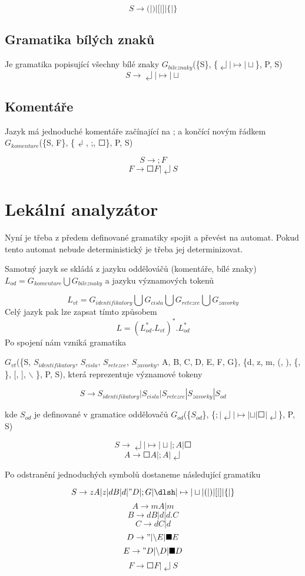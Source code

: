 \documentclass[a4paper,11pt]{article}
\begin{document}
$$S \rightarrow (|)|[|]|\{|\}$$

\subsection{Gramatika bílých znaků}
Je gramatika popisující všechny bílé znaky $G_{bileznaky}$(\{S\}, \{$\dlsh | \mapsto | \sqcup$\}, P, S)
$$S \rightarrow  \dlsh | \mapsto | \sqcup$$

\subsection{Komentáře}
Jazyk má jednoduché komentáře začínající na ; a končící novým řádkem $G_{komentare}$(\{S, F\}, \{$\dlsh$, ;, $\Square$\}, P, S)

$$S \rightarrow ;F$$
$$F \rightarrow \Square F | \dlsh S$$

\section{Lekální analyzátor}
Nyní je třeba z předem definované gramatiky spojit a převést na automat. Pokud tento automat nebude deterministický je třeba jej determinizovat.

Samotný jazyk se skládá z jazyku oddělováčů (komentáře, bílé znaky) $L_{od} = G_{komentare} \bigcup G_{bileznaky}$ a jazyku významových tokenů 

$$L_{vt} = G_{identifikatory} \bigcup G_{cisla} \bigcup G_{retezce} \bigcup G_{zavorky}$$
Celý jazyk pak lze zapsat tímto způsobem 
$$L = (L^{*}_{od}.L_{vt})^{*}.L^{*}_{od}$$
Po spojení nám vzniká gramatika
 
$G_{vt}$(\{S, $S_{identifikatory}$, $S_{cisla}$, $S_{retezce}$, $S_{zavorky}$, A, B, C, D, E, F, G\}, \{d, z, m, (, ), \{, \}, [, ], $\backslash$ \}, P, S), která reprezentuje významové tokeny 

$$S \rightarrow S_{identifikatory} | S_{cisla} | S_{retezce} | S_{zavorky} | S_{od}$$

kde $S_{od}$ je definované v gramatice oddělovačů $G_{od}$(\{$S_{od}$\}, \{$; | \dlsh | \mapsto | \sqcup | \Square | \dlsh$\}, P, S)

$$S \rightarrow \dlsh | \mapsto | \sqcup | ;A | \Square$$
$$A \rightarrow \Square A | ;A | \dlsh $$

Po odstranění jednoduchých symbolů dostaneme následující gramatiku 

$$S \rightarrow zA | z | dB | d | "D | ;G | \dlsh | \mapsto | \sqcup | ( | ) | [ | ] | \{ | \}$$
$$A \rightarrow mA | m$$
$$B \rightarrow dB | d | d.C$$
$$C \rightarrow dC | d$$
$$D \rightarrow " | \backslash E | \blacksquare E$$
$$E \rightarrow "D | \backslash D | \blacksquare D$$
$$F \rightarrow \Square F | \dlsh S$$
\newpage
\end{document}
